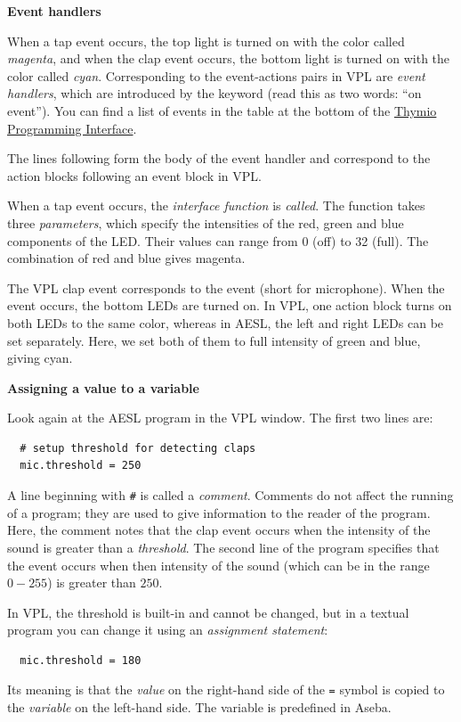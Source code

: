 \documentclass[11pt,a4paper,english]{report}
\begin{document}
\textbf{\large Event handlers}

When a tap event occurs, the top light is turned on with the color
called \emph{magenta}, and when the clap event occurs, the bottom light
is turned on with the color called \emph{cyan}. Corresponding to the
event-actions pairs in VPL are \emph{event handlers}, which are
introduced by the keyword  (read this as two words: ``on
event''). You can find a list of events in the table at the bottom of
the \href{https://aseba.wikidot.com/en:thymioapi}{Thymio Programming
Interface}.

The lines following  form the body of the event handler
and correspond to the action blocks following an event block in VPL.

When a tap event occurs, the \emph{interface function}  is
\emph{called}. The function takes three \emph{parameters}, which specify
the intensities of the red, green and blue components of the LED.
Their values can range from 0 (off) to 32 (full). The combination of red
and blue gives magenta.

The VPL clap event corresponds to the  event (short for
microphone). When the event occurs, the bottom LEDs are turned on. In
VPL, one action block turns on both LEDs to the same color, whereas in
AESL, the left and right LEDs can be set separately. Here, we set both
of them to full intensity of green and blue, giving cyan.

\textbf{\large Assigning a value to a variable}

Look again at the AESL program in the VPL window. The first two lines are:
\begin{footnotesize}
\begin{verbatim}
  # setup threshold for detecting claps
  mic.threshold = 250
\end{verbatim}
\end{footnotesize}

A line beginning with \verb+#+ is called a \emph{comment}. Comments do
not affect the running of a program; they are used to give information
to the reader of the program. Here, the comment notes that the clap
event occurs when the intensity of the sound is greater than a
\emph{threshold}. The second line of the program specifies that the
event occurs when then intensity of the sound (which can be in the range
$0-255$) is greater than $250$.

In VPL, the threshold is built-in and cannot be changed, but in a
textual program you can change it using an \emph{assignment statement}:
\begin{verbatim}
  mic.threshold = 180
\end{verbatim}
Its meaning is that the \emph{value} on the right-hand side of the
\verb+=+ symbol is copied to the \emph{variable} on the left-hand side.
The variable  is predefined in Aseba.
\end{document}
